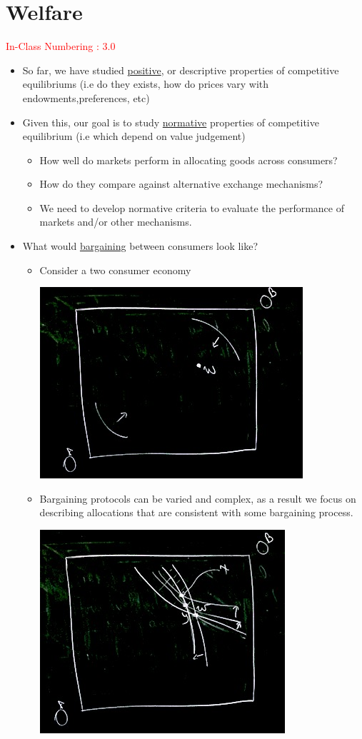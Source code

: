 \documentclass[twoside]{article}
\begin{document}
\section{Welfare}
\textcolor{red}{In-Class Numbering : 3.0}
\begin{itemize}
\item So far, we have studied \underline{positive}, or descriptive properties of competitive equilibriums (i.e do they exists, how do prices vary with endowments,preferences, etc) 
\item Given this, our goal is to study \underline{normative} properties of competitive equilibrium (i.e which depend on value judgement) 
\begin{itemize}
\item How well do markets perform in allocating goods across consumers?
\item How do they compare against alternative exchange mechanisms?
\item We need to develop normative criteria to evaluate the performance of markets and/or other mechanisms. 
\end{itemize}
\item What would \underline{bargaining} between consumers look like? 
\begin{itemize}
\item Consider a two consumer economy 
\begin{center}
\includegraphics[scale=0.4]{19}
\end{center}
\item Bargaining protocols can be varied and complex, as a result we focus on describing allocations that are consistent with some bargaining process. 
\begin{center}
\includegraphics[scale=0.4]{20}

\end{center}
\end{itemize}
\end{itemize}
\end{document}
